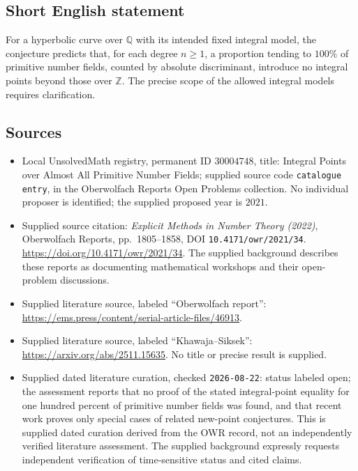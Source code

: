 \documentclass[11pt]{article}
\newcommand{\Z}{\mathbb{Z}}
\newcommand{\Q}{\mathbb{Q}}
\begin{document}
\subsection{Short English statement}
For a hyperbolic curve over \(\Q\) with its intended fixed integral model, the conjecture predicts that, for each degree \(n\geq1\), a proportion tending to \(100\%\) of primitive number fields, counted by absolute discriminant, introduce no integral points beyond those over \(\Z\). The precise scope of the allowed integral models requires clarification.
\subsection{Sources}
\begin{itemize}
\item Local UnsolvedMath registry, permanent ID \(30004748\), title: Integral Points over Almost All Primitive Number Fields; supplied source code \texttt{catalogue entry}, in the Oberwolfach Reports Open Problems collection. No individual proposer is identified; the supplied proposed year is \(2021\).
\item Supplied source citation: \emph{Explicit Methods in Number Theory (2022)}, Oberwolfach Reports, pp.\ 1805--1858, DOI \texttt{10.4171/owr/2021/34}. \url{https://doi.org/10.4171/owr/2021/34}. The supplied background describes these reports as documenting mathematical workshops and their open-problem discussions.
\item Supplied literature source, labeled ``Oberwolfach report'': \url{https://ems.press/content/serial-article-files/46913}.
\item Supplied literature source, labeled ``Khawaja--Siksek'': \url{https://arxiv.org/abs/2511.15635}. No title or precise result is supplied.
\item Supplied dated literature curation, checked \texttt{2026-08-22}: status labeled open; the assessment reports that no proof of the stated integral-point equality for one hundred percent of primitive number fields was found, and that recent work proves only special cases of related new-point conjectures. This is supplied dated curation derived from the OWR record, not an independently verified literature assessment. The supplied background expressly requests independent verification of time-sensitive status and cited claims.
\end{itemize}
\end{document}
